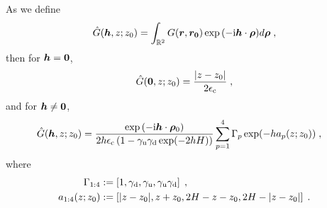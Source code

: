 \begin{thm}\label{Proposition...GreensFunction}
    As we define
    \begin{equation}
        \Hat{G}(\boldsymbol{h}, z; z_0) = \int_{\mathbb{R}^2} G(\boldsymbol{r}, \boldsymbol{r_0}) \exp{(-\mathrm{i} \boldsymbol{h} \cdot \boldsymbol{\rho})} d \bm{\rho}\;,
    \end{equation}
then for $\boldsymbol{h}=\bm{0}$,
\begin{equation}\label{eq...hat_G_solution...Zeroth}
        \hat{G}(\bm{0}, z; z_0) = \frac{\lvert z-z_0\rvert}{2 \epsilon_{\mathrm{c}}}\;,
\end{equation}
and for $\boldsymbol{h}\neq \bm{0}$,
    \begin{equation}\label{eq...hat_G_solution...Non-zero}
    \begin{aligned}
\hat{G}(\V{h}, z; z_0) &=  \frac{ \exp{(-\mathrm{i} \V{h} \cdot \V{\rho}_0)}}{2 h \epsilon_{\mrm{c}}\left(1-\gamma_{\mrm{u}}\gamma_{\mrm{d}}\exp(-2 h H)\right)} \sum_{p=1}^4\Gamma_p\exp(- h a_p(z;z_0))\;, %
    \end{aligned}     
    \end{equation}
where 
\begin{align*}
 \Gamma_{1:4}&:=\left[1,\gamma_{\mathrm{d}},\gamma_{\mathrm{u}},\gamma_{\mathrm{u}}\gamma_{\mathrm{d}}\right]\;,\\
 a_{1:4}(z;z_0)&:=\left[\lvert z-z_0\rvert, z+z_0,2H-z-z_0,2H-\lvert z-z_0\rvert\right]\;.
\end{align*}
\end{thm}
